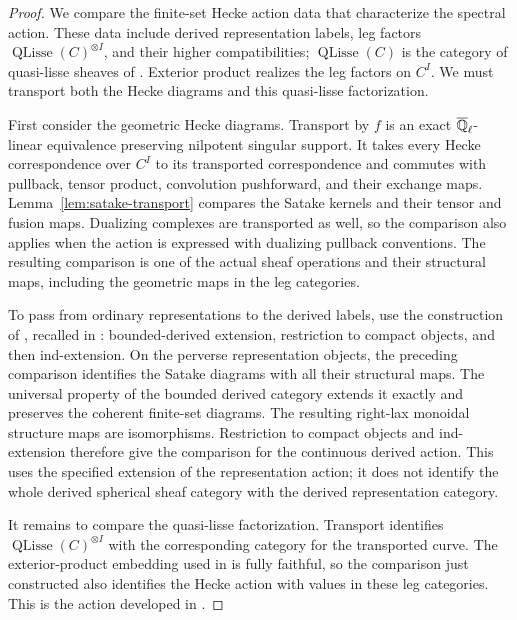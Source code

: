 \begin{proof}
We compare the finite-set Hecke action data that characterize the
spectral action.  These data include derived representation labels,
leg factors $\operatorname{QLisse}(C)^{\otimes I}$, and their higher
compatibilities; $\operatorname{QLisse}(C)$ is the category of
quasi-lisse sheaves of \cite[Section~8.1.1]{AGKRRV}.  Exterior product
realizes the leg factors on $C^I$.  We must transport both the Hecke
diagrams and this quasi-lisse factorization.

First consider the geometric Hecke diagrams.  Transport by $f$ is
an exact $\overline{\mathbb Q}_{\ell}$-linear equivalence preserving nilpotent singular support.
It takes every Hecke correspondence over $C^I$ to its transported
correspondence and commutes with pullback, tensor product, convolution
pushforward, and their exchange maps.  Lemma~\ref{lem:satake-transport}
compares the Satake kernels and their tensor and fusion maps.
Dualizing complexes are transported as well, so the comparison also
applies when the action is expressed with dualizing pullback conventions.
The resulting comparison is one of the actual sheaf operations and
their structural maps, including the geometric maps in the leg categories.

To pass from ordinary representations to the derived labels, use the
construction of \cite[Sections~B.3.6--B.3.8]{GKRV}, recalled in
\cite[Section~14.2.2]{AGKRRV}: bounded-derived extension, restriction
to compact objects, and then ind-extension.  On the perverse
representation objects, the preceding comparison identifies the
Satake diagrams with all their structural maps.  The universal
property of the bounded derived category extends it exactly and
preserves the coherent finite-set diagrams.  The resulting right-lax
monoidal structure maps are isomorphisms.  Restriction to compact
objects and ind-extension therefore give the comparison for the
continuous derived action.  This uses the specified extension of the
representation action; it does not identify the whole derived
spherical sheaf category with the derived representation category.

It remains to compare the quasi-lisse factorization.  Transport
identifies $\operatorname{QLisse}(C)^{\otimes I}$ with the corresponding
category for the transported curve.  The exterior-product embedding
used in \cite[Section~14.2.5]{AGKRRV} is fully faithful, so the
comparison just constructed also identifies the Hecke action with
values in these leg categories.  This is the action developed in
\cite[Sections~14.2.5--14.2.8 and Main Theorem~14.3.2]{AGKRRV}.


\end{proof}
